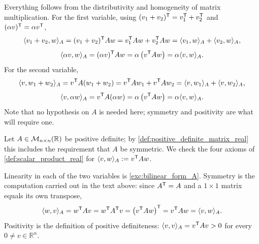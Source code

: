 \begin{exercisesolution}
\label{sol:bilinear_form_A}
  Everything follows from the distributivity and homogeneity of matrix multiplication. For the first variable, using $(v_1 + v_2)^{\mathsf{T}} = v_1^{\mathsf{T}} + v_2^{\mathsf{T}}$ and $(\alpha v)^{\mathsf{T}} = \alpha v^{\mathsf{T}}$,
  \[ \langle v_1 + v_2, w \rangle_A = (v_1 + v_2)^{\mathsf{T}} A w = v_1^{\mathsf{T}} A w + v_2^{\mathsf{T}} A w = \langle v_1, w \rangle_A + \langle v_2, w \rangle_A, \]
  \[ \langle \alpha v, w \rangle_A = (\alpha v)^{\mathsf{T}} A w = \alpha \left( v^{\mathsf{T}} A w \right) = \alpha \langle v, w \rangle_A. \]
  For the second variable,
  \[ \langle v, w_1 + w_2 \rangle_A = v^{\mathsf{T}} A (w_1 + w_2) = v^{\mathsf{T}} A w_1 + v^{\mathsf{T}} A w_2 = \langle v, w_1 \rangle_A + \langle v, w_2 \rangle_A, \]
  \[ \langle v, \alpha w \rangle_A = v^{\mathsf{T}} A (\alpha w) = \alpha \left( v^{\mathsf{T}} A w \right) = \alpha \langle v, w \rangle_A. \]
  Note that no hypothesis on $A$ is needed here; symmetry and positivity are what will require one.
\end{exercisesolution}

\begin{exercisesolution}
\label{sol:pos_def_gives_scalar_product}
  Let $A \in \mathcal{M}_{n \times n}(\mathbb{R})$ be positive definite; by \cref{def:positive_definite_matrix_real} this includes the requirement that $A$ be symmetric. We check the four axioms of \cref{def:scalar_product_real} for $\langle v, w \rangle_A := v^{\mathsf{T}} A w$.

  Linearity in each of the two variables is \cref{exc:bilinear_form_A}. Symmetry is the computation carried out in the text above: since $A^{\mathsf{T}} = A$ and a $1 \times 1$ matrix equals its own transpose,
  \[ \langle w, v \rangle_A = w^{\mathsf{T}} A v = w^{\mathsf{T}} A^{\mathsf{T}} v = \left( v^{\mathsf{T}} A w \right)^{\mathsf{T}} = v^{\mathsf{T}} A w = \langle v, w \rangle_A. \]
  Positivity is the definition of positive definiteness: $\langle v, v \rangle_A = v^{\mathsf{T}} A v > 0$ for every $0 \ne v \in \mathbb{R}^n$.
\end{exercisesolution}


